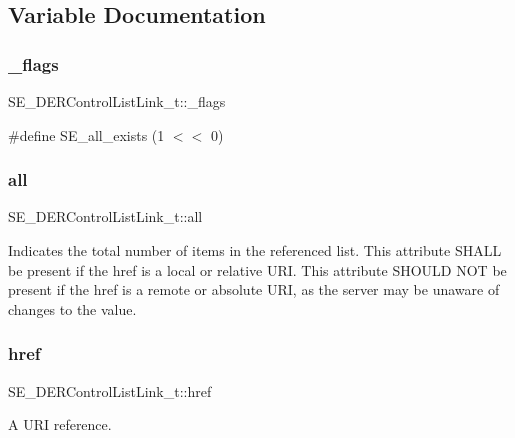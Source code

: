 \subsection{Variable Documentation}
\mbox{\label{group__DERControlListLink_ga1252d821e67ab41c8caafaaf8f3e83be}} 
\subsubsection{\texorpdfstring{\+\_\+flags}{\_flags}}
{\footnotesize\ttfamily S\+E\+\_\+\+D\+E\+R\+Control\+List\+Link\+\_\+t\+::\+\_\+flags}

\#define S\+E\+\_\+all\+\_\+exists (1 $<$$<$ 0) \mbox{\label{group__DERControlListLink_ga3fbaa85b2e1da1b034164f21a22a1503}} 
\subsubsection{\texorpdfstring{all}{all}}
{\footnotesize\ttfamily S\+E\+\_\+\+D\+E\+R\+Control\+List\+Link\+\_\+t\+::all}

Indicates the total number of items in the referenced list. This attribute S\+H\+A\+LL be present if the href is a local or relative U\+RI. This attribute S\+H\+O\+U\+LD N\+OT be present if the href is a remote or absolute U\+RI, as the server may be unaware of changes to the value. \mbox{\label{group__DERControlListLink_gafecc636897f0be0e049531c10b59621d}} 
\subsubsection{\texorpdfstring{href}{href}}
{\footnotesize\ttfamily S\+E\+\_\+\+D\+E\+R\+Control\+List\+Link\+\_\+t\+::href}

A U\+RI reference. 